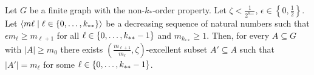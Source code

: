     \lemma[Claim 5.4.1]\label{existance_of_excellent_subsets_fixed_size_choices}
        Let $G$ be a finite graph with the non-$k_{*}$-order property.
        Let $\zeta < \frac{1}{2^{k_{**}}}$, $\epsilon \in \left\{ 0, \frac{1}{2} \right\}$.
        Let $\left< m\ell \mid \ell \in \left\{ 0, \dots, k_{**} \right\} \right>$ be a decreasing sequence of natural numbers such that
        $\epsilon m_{\ell} \geq m_{\ell+1}$ for all $\ell \in \left\{ 0, \dots, k_{**}-1 \right\}$ and $m_{k_{**}} \geq 1$.
        Then, for every $A \subseteq G$ with $|A| \geq m_0$ there exists
        $\left(\frac{m_{\ell+1}}{m_{\ell}}, \zeta\right)$-excellent subset $A' \subseteq A$ such that $|A'| = m_\ell$ for
        some $\ell \in \left\{ 0, \dots, k_{**}-1 \right\}$.
